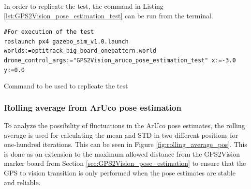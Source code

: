\documentclass[../Head/report.tex]{subfiles}
\begin{document}
In order to replicate the test, the command in Listing \ref{lst:GPS2Vision_pose_estimation_test} can be run from the terminal.

\begin{listing}[H] 
\begin{tcolorbox}[
    enhanced,
    attach boxed title to top left={xshift=6mm,yshift=-3mm},
    colback=lightgreen!20,
    colframe=lightgreen,
    fonttitle=\bfseries\color{black},
]
\begin{verbatim}
#For execution of the test
roslaunch px4 gazebo_sim_v1.0.launch worlds:=optitrack_big_board_onepattern.world drone_control_args:="GPS2Vision_aruco_pose_estimation_test" x:=-3.0 y:=0.0 
\end{verbatim}
\end{tcolorbox}
\caption{Command to be used to replicate the test}
\label{lst:GPS2Vision_pose_estimation_test}    
\end{listing} 

\subsubsection{Rolling average from ArUco pose estimation}
\label{sec:rolling_average_aruco_pose_estimation}

To analyze the possibility of fluctuations in the ArUco pose estimates, the rolling average is used for calculating the mean and STD in two different positions for one-hundred iterations. This can be seen in Figure \ref{fig:rolling_average_pos}. This is done as an extension to the maximum allowed distance from the GPS2Vision marker board from Section \ref{sec:GPS2Vision_pose_estimation} to ensure that the GPS to vision transition is only performed when the pose estimates are stable and reliable. 
\end{document}
